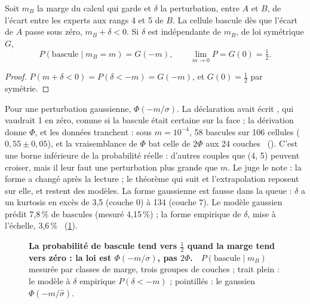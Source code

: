 \begin{proposition}\label{t3tro:prop:bascule}
Soit $m_B$ la marge du calcul qui garde et $\delta$ la perturbation, entre $A$ et $B$, de l'écart entre les experts aux rangs 4 et 5 de $B$. La cellule bascule dès que l'écart de $A$ passe sous zéro, $m_B + \delta < 0$. Si $\delta$ est indépendante de $m_B$, de loi symétrique $G$,
\begin{equation}\label{t3tro:eq:bascule}
P(\text{bascule} \mid m_B = m) = G(-m), \qquad \lim_{m \to 0} P = G(0) = \tfrac12 .
\end{equation}
\end{proposition}
\begin{proof}
$P(m + \delta < 0) = P(\delta < -m) = G(-m)$, et $G(0) = \tfrac12$ par symétrie.
\end{proof}
Pour une perturbation gaussienne, $\Phi(-m/\sigma)$. La déclaration avait écrit , qui vaudrait 1 en zéro, comme si la bascule était certaine sur la face ; la dérivation donne $\Phi$, et les données tranchent : sous $m = 10^{-4}$, 58 bascules sur 106 cellules ($0{,}55 \pm 0{,}05$), et la vraisemblance de $\Phi$ bat celle de $2\Phi$ aux 24 couches \mes~(). C'est une borne inférieure de la probabilité réelle : d'autres couples que (4, 5) peuvent croiser, mais il leur faut une perturbation plus grande que $m$. Le juge le note : la forme a changé après la lecture ; le théorème qui suit et l'extrapolation reposent sur elle, et restent des modèles. La forme gaussienne est fausse dans la queue : $\delta$ a un kurtosis en excès de 3,5 (couche 0) à 134 (couche 7). Le modèle gaussien prédit 7,8\,\% de bascules (mesuré 4,15\,\%) ; la forme empirique de $\delta$, mise à l'échelle, 3,6\,\% \calc~(\cref{fig:t3-trop-loi-bascule}).

\begin{figure}[tbp]
\centering
\GrapheTropicaleLoiBascule
\caption[La loi de bascule]{\textbf{La probabilité de bascule tend vers $\tfrac12$ quand la marge tend vers zéro : la loi est $\Phi(-m/\sigma)$, pas $2\Phi$.} \mes\,\calc~$P(\text{bascule} \mid m_B)$ mesurée par classes de marge, trois groupes de couches ; trait plein : le modèle à $\delta$ empirique $P(\delta < -m)$ ; pointillés : le gaussien $\Phi(-m/\hat\sigma)$. }
\label{fig:t3-trop-loi-bascule}
\end{figure}

